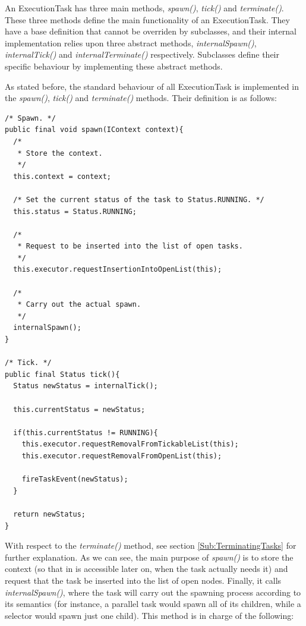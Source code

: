 \documentclass[a4paper,10pt]{article}
\begin{document}
An ExecutionTask has three main methods, \textit{spawn()}, \textit{tick()} and \textit{terminate()}. These three methods define the main functionality of an ExecutionTask. They have a base definition that cannot be overriden by subclasses, and their internal implementation relies upon three abstract methods, \textit{internalSpawn()}, \textit{internalTick()} and \textit{internalTerminate()} respectively. Subclasses define their specific behaviour by implementing these abstract methods.

As stated before, the standard behaviour of all ExecutionTask is implemented in the \textit{spawn()}, \textit{tick()} and \textit{terminate()} methods. Their definition is as follows:

\begin{verbatim}
/* Spawn. */
public final void spawn(IContext context){
  /*
   * Store the context.
   */
  this.context = context;

  /* Set the current status of the task to Status.RUNNING. */
  this.status = Status.RUNNING;

  /*
   * Request to be inserted into the list of open tasks.
   */
  this.executor.requestInsertionIntoOpenList(this);
  
  /*
   * Carry out the actual spawn.
   */
  internalSpawn();
}

/* Tick. */
public final Status tick(){
  Status newStatus = internalTick();

  this.currentStatus = newStatus;

  if(this.currentStatus != RUNNING){
    this.executor.requestRemovalFromTickableList(this);
    this.executor.requestRemovalFromOpenList(this);

    fireTaskEvent(newStatus);
  } 

  return newStatus;
}

\end{verbatim}

With respect to the \textit{terminate()} method, see section \ref{Sub:TerminatingTasks} for further explanation. As we can see, the main purpose of \textit{spawn()} is to store the context (so that in is accessible later on, when the task actually needs it) and request that the task be inserted into the list of open nodes. Finally, it calls \textit{internalSpawn()}, where the task will carry out the spawning process according to its semantics (for instance, a parallel task would spawn all of its children, while a selector would spawn just one child). This method is in charge of the following:
\end{document}
